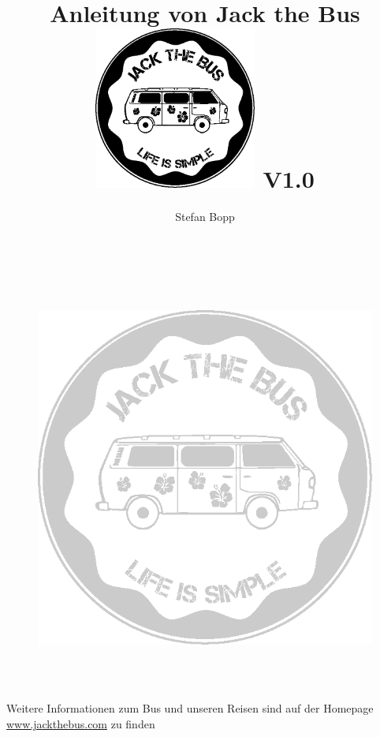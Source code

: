 \documentclass[10pt,nswissgerman,]{article}
\begin{document}
\author{Stefan Bopp}
\title{\Huge Anleitung von Jack the Bus\vspace{2cm}
\includegraphics[width=0.4\textwidth]{../Bilder/Logo/Logo.png}
\centering
\vfill
{\large V1.0}
}
\maketitle
\vfill
{}
\cfoot{\thepage}
\newpage
\tableofcontents

\newpage


\newpage
\listoffigures
\newpage
\begin{figure}[H]
    \centering
    \includegraphics[width=\textwidth,height=14cm, keepaspectratio]{../Bilder/Logo/Logo_trans.png}
    \label{img:Logo}
\end{figure}
\vfill
    \begin{center}
        {\huge  Weitere Informationen zum Bus und unseren Reisen sind auf der Homepage {\url{www.jackthebus.com}} zu finden}
\end{center}
\end{document}
